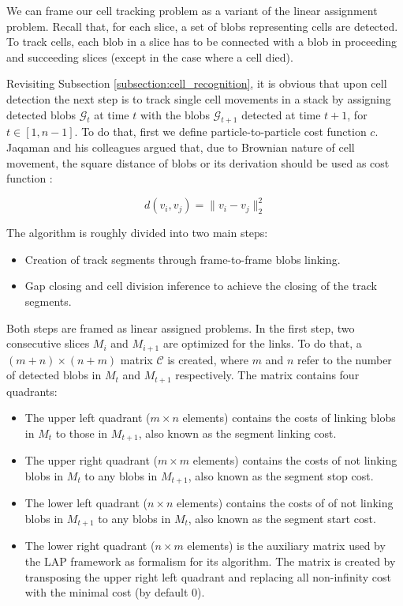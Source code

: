 \documentclass[pdftex,12pt,a4paper]{report}
\begin{document}
We can frame our cell tracking problem as a variant of the linear assignment problem. Recall that, for each slice, a set of blobs representing cells are detected. To track cells, each blob in a slice has to be connected with a blob in proceeding and succeeding slices (except in the case where a cell died).

Revisiting Subsection \ref{subsection:cell_recognition}, it is obvious that upon cell detection the next step is to track single cell movements in a stack by assigning detected blobs $\mathcal{G}_t$ at time $t$ with the blobs $\mathcal{G}_{t + 1}$ detected at time $t + 1$,  for $t \in [1,n - 1]$. To do that, first we define particle-to-particle cost function $c$. Jaqaman and his colleagues argued that, due to Brownian nature of cell movement, the square distance of blobs or its derivation should be used as cost function \cite{jaqaman2008robust}: 

\begin{equation}
d(v_i, v_j) = \| v_i - v_j\|^2_2
\label{eq:particle_cost_function}
\end{equation}

The algorithm is roughly divided into two main steps:

\begin{itemize}
\item  Creation of track segments through frame-to-frame blobs linking.
\item  Gap closing and cell division inference to achieve the closing of the track segments.
\end{itemize}

Both steps are framed as linear assigned problems. In the first step, two consecutive slices $M_i$  and $M_{i+1}$ are optimized for the links. To do that, a $(m + n) \times (n + m)$ matrix $\mathcal{C}$ is created, where $m$ and $n$ refer to the number of detected blobs in $M_t$ and $M_{t + 1}$ respectively. The matrix contains four quadrants:

\begin{itemize}
\item The upper left quadrant ($m \times n$ elements) contains the costs of linking blobs in $M_t$ to those in $M_{t + 1}$, also known as the segment linking cost.
\item The upper right quadrant ($m \times m$ elements) contains the costs of not linking blobs in $M_t$ to any blobs in $M_{t + 1}$, also known as the segment stop cost.
\item The lower left quadrant ($n \times n$ elements) contains the costs of of not linking blobs in $M_{t + 1}$ to any blobs in $M_t$, also known as the segment start cost.
\item The lower right quadrant ($n \times m$ elements) is the auxiliary matrix used by the LAP framework as formalism for its algorithm. The matrix is created by transposing the upper right left quadrant and replacing all non-infinity cost with the minimal cost (by default 0).
\end{itemize}
\end{document}
